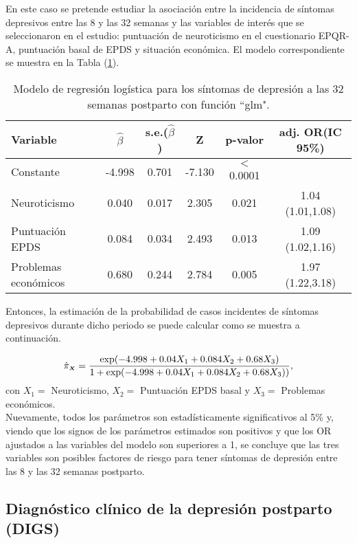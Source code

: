 En este caso se pretende estudiar la asociación entre la incidencia de síntomas depresivos entre las 8 y las 32 semanas y las variables de interés que se seleccionaron en el estudio: puntuación de neuroticismo en el cuestionario EPQR-A, puntuación basal de EPDS y situación económica. El modelo correspondiente se muestra en la Tabla (\ref{tab:8}).

\begin{table} [H]
	\centering
	\begin{tabular}{l c c c c c}
		\toprule
		\textbf{Variable} & $\hat{\beta}$ & s.e.($\hat{\beta}$) & Z & p-valor & adj. OR(IC 95\%)\\
		\midrule
		Constante &   -4.998  &  0.701 & -7.130  &  $<$ 0.0001   &  \\
		Neuroticismo &   0.040  &  0.017  & 2.305 & 0.021 &1.04 (1.01,1.08)  \\
		Puntuación EPDS &   0.084 &  0.034 &  2.493 & 0.013 & 1.09 (1.02,1.16)\\
		Problemas económicos & 0.680  &  0.244   & 2.784  &0.005 & 1.97 (1.22,3.18)\\
		\bottomrule
	\end{tabular}
	\caption{Modelo de regresión logística para los síntomas de depresión a las 32 semanas postparto con función ``glm".}
	\label{tab:8}
\end{table}

Entonces, la estimación de la probabilidad de casos incidentes de síntomas depresivos durante dicho periodo se puede calcular como se muestra a continuación.

\begin{equation*}
\hat{\pi}_{\mathsmaller{\boldsymbol{X}}}=\frac{\exp(-4.998+0.04X_1+0.084X_2+0.68X_3)}{1+\exp(-4.998+0.04X_1+0.084X_2+0.68X_3))},
\end{equation*}
con $X_1=$ Neuroticismo, $X_2=$ Puntuación EPDS basal y $X_3=$ Problemas económicos.\\

Nuevamente, todos los parámetros son estadísticamente significativos al 5\% y, viendo que los signos de los parámetros estimados son positivos y que los OR ajustados a las variables del modelo son superiores a 1, se concluye que las tres variables son posibles factores de riesgo para tener síntomas de depresión entre las 8 y las 32 semanas postparto. 

\subsection{Diagnóstico clínico de la depresión postparto (DIGS)}

